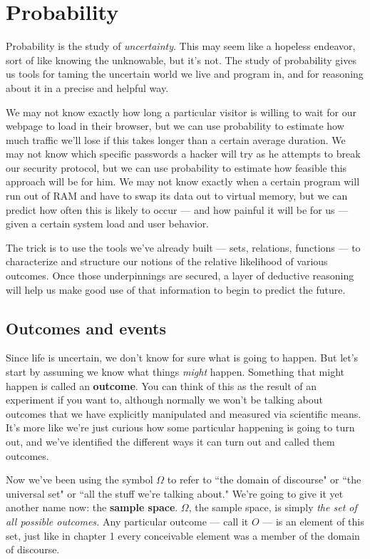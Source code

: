 
\chapter{Probability}

Probability is the study of \textit{uncertainty}. This may seem like a
hopeless endeavor, sort of like knowing the unknowable, but it's not. The
study of probability gives us tools for taming the uncertain world we live
and program in, and for reasoning about it in a precise and helpful way.

We may not know exactly how long a particular visitor is willing to wait
for our webpage to load in their browser, but we can use probability to
estimate how much traffic we'll lose if this takes longer than a certain
average duration. We may not know which specific passwords a hacker will
try as he attempts to break our security protocol, but we can use
probability to estimate how feasible this approach will be for him. We may
not know exactly when a certain program will run out of RAM and have to
swap its data out to virtual memory, but we can predict how often this is
likely to occur --- and how painful it will be for us --- given a certain
system load and user behavior.

The trick is to use the tools we've already built --- sets, relations,
functions --- to characterize and structure our notions of the relative
likelihood of various outcomes. Once those underpinnings are secured, a
layer of deductive reasoning will help us make good use of that information
to begin to predict the future.

\section{Outcomes and events}

Since life is uncertain, we don't know for sure what is going to happen.
But let's start by assuming we know what things \textit{might} happen.
Something that might happen is called an \textbf{outcome}. You can think of
this as the result of an experiment if you want to, although normally we
won't be talking about outcomes that we have explicitly manipulated and
measured via scientific means. It's more like we're just curious how some
particular happening is going to turn out, and we've identified the
different ways it can turn out and called them outcomes.

Now we've been using the symbol $\Omega$ to refer to ``the domain of
discourse" or ``the universal set" or ``all the stuff we're talking about."
We're going to give it yet another name now: the \textbf{sample space}.
$\Omega$, the sample space, is simply \textit{the set of all possible
outcomes.} Any particular outcome --- call it $O$ --- is an element of this
set, just like in chapter 1 every conceivable element was a member of the
domain of discourse.

